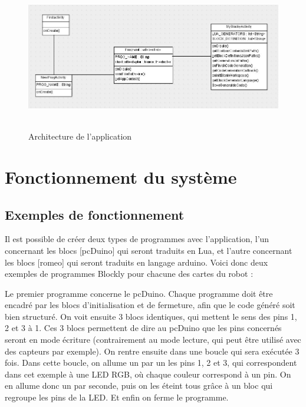 \documentclass[12pt,francais]{report}
\begin{document}
\begin{figure}[!h]
\begin{addmargin}[-10em]{1em}
\includegraphics[scale=0.95]{./images/uml2.jpg}~\\[1.5cm]
\caption{Architecture de l'application}
\end{addmargin}
\end{figure}

\newpage
\chapter*{Fonctionnement du système}

\section*{Exemples de fonctionnement}

Il est possible de créer deux types de programmes avec l'application, l'un concernant les blocs [pcDuino] qui seront traduits en Lua, et l'autre concernant les blocs [romeo] qui seront traduits en langage arduino.
Voici donc deux exemples de programmes Blockly pour chacune des cartes du robot :

\bigskip

Le premier programme concerne le pcDuino. Chaque programme doit être encadré par les blocs d'initialisation et de fermeture, afin que le code généré soit bien structuré. On voit ensuite 3 blocs identiques, qui mettent le sens des pins 1, 2 et 3 à 1. Ces 3 blocs permettent de dire au pcDuino que les pins concernés seront en mode écriture (contrairement au mode lecture, qui peut être utilisé avec des capteurs par exemple). On rentre ensuite dans une boucle qui sera exécutée 3 fois. Dans cette boucle, on allume un par un les pins 1, 2 et 3, qui correspondent dans cet exemple à une LED RGB, où chaque couleur correspond à un pin. On en allume donc un par seconde, puis on les éteint tous grâce à un bloc qui regroupe les pins de la LED. Et enfin on ferme le programme.
\end{document}
